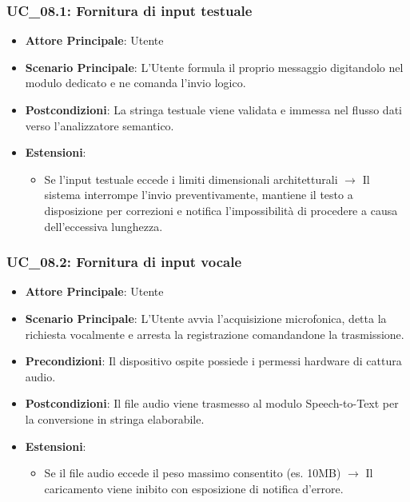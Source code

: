 \subsubsection{UC\_08.1: Fornitura di input testuale}
\label{uc_08.1}
\begin{itemize}
    \item \textbf{Attore Principale}: Utente
    \item \textbf{Scenario Principale}: L'Utente formula il proprio messaggio digitandolo nel modulo dedicato e ne comanda l'invio logico.
    \item \textbf{Postcondizioni}: La stringa testuale viene validata e immessa nel flusso dati verso l'analizzatore semantico.
    \item \textbf{Estensioni}:
    \begin{itemize}
        \item Se l'input testuale eccede i limiti dimensionali architetturali $\rightarrow$ Il sistema interrompe l'invio preventivamente, mantiene il testo a disposizione per correzioni e notifica l'impossibilità di procedere a causa dell'eccessiva lunghezza.
    \end{itemize}
\end{itemize}

\subsubsection{UC\_08.2: Fornitura di input vocale}
\label{uc_08.2}
\begin{itemize}
    \item \textbf{Attore Principale}: Utente
    \item \textbf{Scenario Principale}: L'Utente avvia l'acquisizione microfonica, detta la richiesta vocalmente e arresta la registrazione comandandone la trasmissione.
    \item \textbf{Precondizioni}: Il dispositivo ospite possiede i permessi hardware di cattura audio.
    \item \textbf{Postcondizioni}: Il file audio viene trasmesso al modulo Speech-to-Text per la conversione in stringa elaborabile.
    \item \textbf{Estensioni}:
    \begin{itemize}
        \item Se il file audio eccede il peso massimo consentito (es. 10MB) $\rightarrow$ Il caricamento viene inibito con esposizione di notifica d'errore.
    \end{itemize}
\end{itemize}

